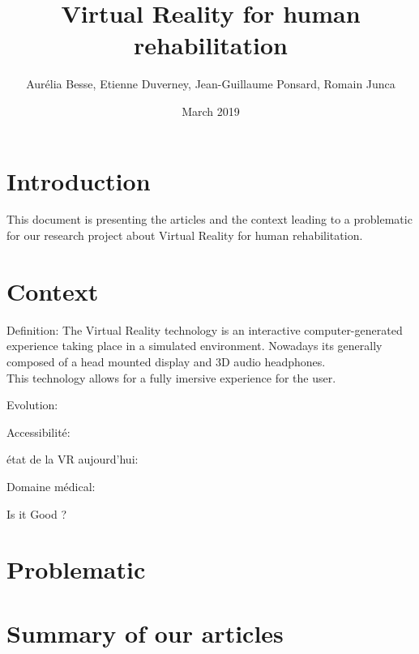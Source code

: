 \documentclass{article}
\title{Virtual Reality for human rehabilitation}
\author{ Aurélia Besse, Etienne Duverney, Jean-Guillaume Ponsard, Romain Junca }
\date{March 2019}
\begin{document}
\maketitle

\section{Introduction}

This document is presenting the articles and the context leading to a problematic for our research project about Virtual Reality for human rehabilitation.


\section{Context}

Definition:
The Virtual Reality technology is an interactive computer-generated experience taking place in a simulated environment. Nowadays its generally composed of a head mounted display and 3D audio headphones. \\
This technology allows for a fully imersive experience for the user.

Evolution:


Accessibilité:


état de la VR aujourd'hui:


Domaine médical:


Is it Good ?


\section{Problematic}


\section{Summary of our articles}
\end{document}
